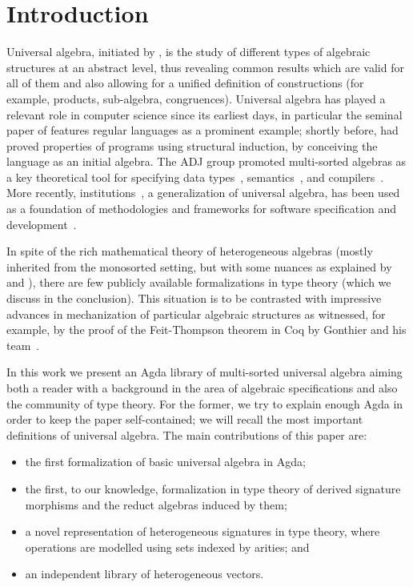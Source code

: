 \section{Introduction}

Universal algebra, initiated by \cite{birkhoff-1935}, is the study of
different types of algebraic structures at an abstract level, thus
revealing common results which are valid for all of them and also
allowing for a unified definition of constructions (for example,
products, sub-algebra, congruences). Universal algebra has played a
relevant role in computer science since its earliest days, in
particular the seminal paper of \cite{birkhoff-70} features regular
languages as a prominent example; shortly before, \cite{burstall69}
had proved properties of programs using structural induction, by
conceiving the language as an initial algebra. The ADJ
group \citep[see][]{goguen-adj} promoted multi-sorted algebras as a key
theoretical tool for specifying data
types~\citep{adj-abstract-data-types}, semantics~\citep{goguen-77}, and
compilers~\citep{thatcher1981more}.  More recently,
institutions~\citep{goguen-92}, a generalization of universal algebra,
has been used as a foundation of methodologies and frameworks for
software specification and development~\citep{sannella2012foundations}.

In spite of the rich mathematical theory of heterogeneous algebras
(mostly inherited from the monosorted setting, but with some nuances
as explained by \cite{tarlecki-nuances} and \cite{adamek-2012}), there are few publicly
available formalizations in type theory (which we discuss in the
conclusion).  This situation is to be contrasted with impressive
advances in mechanization of particular algebraic structures as
witnessed, for example, by the proof of the Feit-Thompson theorem in
Coq by Gonthier and his team~\citeyearpar{gonthier2013machine}.

In this work we present an Agda library of multi-sorted universal
algebra aiming both a reader with a background in the area of
algebraic specifications and also the community of type theory.  For
the former, we try to explain enough Agda in order to keep the paper
self-contained; we will recall the most important definitions of
universal algebra. The main contributions of this paper are:
\begin{itemize}
\item the first formalization of basic universal algebra in Agda;
\item the first, to our knowledge, formalization in type theory of
  derived signature morphisms and the reduct algebras induced by them;
\item a novel representation of heterogeneous signatures in
  type theory, where operations are modelled using sets indexed by
  arities; and
\item an independent library of heterogeneous vectors.
\end{itemize}

